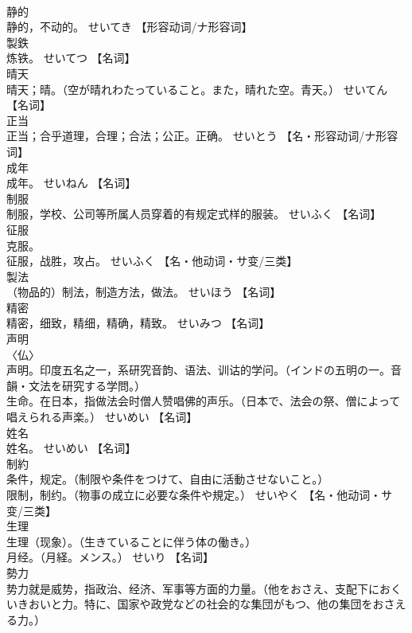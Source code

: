 \documentclass[8pt]{extreport}
\begin{document}
\begin{CJK}{UTF8}{min}
\\	静的	
\\	静的，不动的。	せいてき		【形容动词/ナ形容词】
\\	製鉄	
\\	炼铁。	せいてつ		【名词】
\\	晴天	
\\	晴天；晴。（空が晴れわたっていること。また，晴れた空。青天。）	せいてん		【名词】
\\	正当	
\\	正当；合乎道理，合理；合法；公正。正确。	せいとう		【名・形容动词/ナ形容词】
\\	成年	
\\	成年。	せいねん		【名词】
\\	制服	
\\	制服，学校、公司等所属人员穿着的有规定式样的服装。	せいふく		【名词】
\\	征服	
\\	克服。 
\\	征服，战胜，攻占。	せいふく		【名・他动词・サ变/三类】
\\	製法	
\\	（物品的）制法，制造方法，做法。	せいほう		【名词】
\\	精密	
\\	精密，细致，精细，精确，精致。	せいみつ		【名词】
\\	声明	
\\	〈仏〉 
\\	声明。印度五名之一，系研究音韵、语法、训诂的学问。（インドの五明の一。音韻・文法を研究する学問。） 
\\	生命。在日本，指做法会时僧人赞唱佛的声乐。（日本で、法会の祭、僧によって唱えられる声楽。）	せいめい		【名词】
\\	姓名	
\\	姓名。	せいめい		【名词】
\\	制約	
\\	条件，规定。（制限や条件をつけて、自由に活動させないこと。） 
\\	限制，制约。（物事の成立に必要な条件や規定。）	せいやく		【名・他动词・サ变/三类】
\\	生理	
\\	生理（现象）。（生きていることに伴う体の働き。） 
\\	月经。（月経。メンス。）	せいり		【名词】
\\	勢力	
\\	势力就是威势，指政治、经济、军事等方面的力量。（他をおさえ、支配下におくいきおいと力。特に、国家や政党などの社会的な集団がもつ、他の集団をおさえる力。） 

\end{CJK}
\end{document}
